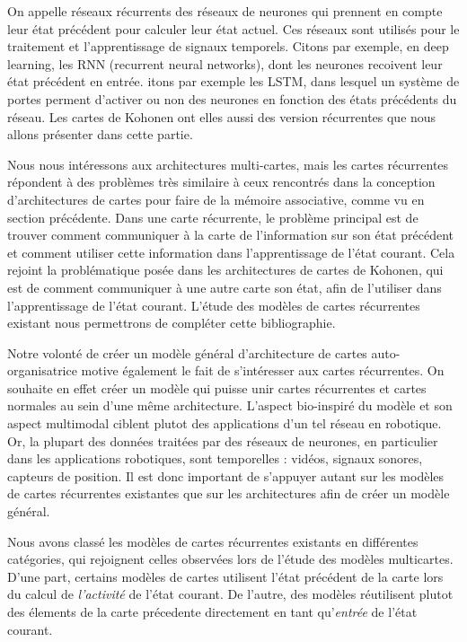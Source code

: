 \documentclass[../main]{subfiles}
\begin{document}
On appelle réseaux récurrents des réseaux de neurones qui prennent en compte leur état précédent pour calculer leur état actuel. Ces réseaux sont utilisés pour le traitement et l'apprentissage de signaux temporels. Citons par exemple, en deep learning, les RNN (recurrent neural networks), dont les neurones recoivent leur état précédent en entrée. itons par exemple les LSTM, dans lesquel un système de portes perment d'activer ou non des neurones en fonction des états précédents du réseau. Les cartes de Kohonen ont elles aussi des version récurrentes que nous allons présenter dans cette partie.

Nous nous intéressons aux architectures multi-cartes, mais les cartes récurrentes répondent à des problèmes très similaire à ceux rencontrés dans la conception d'architectures de cartes pour faire de la mémoire associative, comme vu en section précédente.
Dans une carte récurrente, le problème principal est de trouver comment communiquer à la carte de l'information sur son état précédent et comment utiliser cette information dans l'apprentissage de l'état courant. Cela rejoint la problématique posée dans les architectures de cartes de Kohonen, qui est de comment communiquer à une autre carte son état, afin de l'utiliser dans l'apprentissage de l'état courant. L'étude des modèles de cartes récurrentes existant nous permettrons de compléter cette bibliographie. 

Notre volonté de créer un modèle général d'architecture de cartes auto-organisatrice motive également le fait de s'intéresser aux cartes récurrentes. On souhaite en effet créer un modèle qui puisse unir cartes récurrentes et cartes normales au sein d'une même architecture. L'aspect bio-inspiré du modèle et son aspect multimodal ciblent plutot des applications d'un tel réseau en robotique. Or, la plupart des données traitées par des réseaux de neurones, en particulier dans les applications robotiques, sont temporelles : vidéos, signaux sonores, capteurs de position. Il est donc important de s'appuyer autant sur les modèles de cartes récurrentes existantes que sur les architectures afin de créer un modèle général.

Nous avons classé les modèles de cartes récurrentes existants en différentes catégories, qui rejoignent celles observées lors de l'étude des modèles multicartes.
D'une part, certains modèles de cartes utilisent l'état précédent de la carte lors du calcul de \emph{l'activité} de l'état courant. De l'autre, des modèles réutilisent plutot des élements de la carte précedente directement en tant qu'\emph{entrée} de l'état courant.
\end{document}
